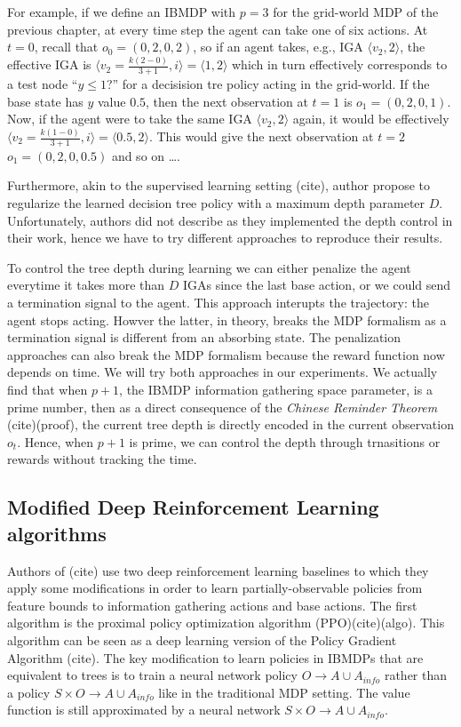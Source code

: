 For example, if we define an IBMDP with $p=3$ for the grid-world MDP of the previous chapter, at every time step the agent can take one of six actions. 
At $t=0$, recall that $o_0=(0, 2, 0, 2)$, so if an agent takes, e.g., IGA $\langle v_2, 2 \rangle$, the effective IGA is $\langle v_2=\frac{k(2-0)}{3+1}, i \rangle = \langle 1, 2 \rangle$ which in turn effectively corresponds to a test node ``$y \leq 1$?'' for a decisision tre policy acting in the grid-world.
If the base state has $y$ value $0.5$, then the next observation at $t=1$ is $o_1=(0, 2, 0, 1)$. Now, if the agent were to take the same IGA $\langle v_2, 2 \rangle$ again, it would be effectively $\langle v_2=\frac{k(1-0)}{3+1}, i \rangle = \langle 0.5, 2 \rangle$. 
This would give the next observation at $t=2$ $o_1=(0, 2, 0, 0.5)$ and so on \dots. 

Furthermore, akin to the supervised learning setting (cite), author propose to regularize the learned decision tree policy with a maximum depth parameter $D$.
Unfortunately, authors did not describe as they implemented the depth control in their work, hence we have to try different approaches to reproduce their results.

To control the tree depth during learning we can either penalize the agent everytime it takes more than $D$ IGAs since the last base action, or we could send a termination signal to the agent. This approach interupts the trajectory: the agent stops acting. Howver the latter, in theory, breaks the MDP formalism as a termination signal is different from an absorbing state.
The penalization approaches can also break the MDP formalism because the reward function now depends on time. We will try both approaches in our experiments.
We actually find that when $p+1$, the IBMDP information gathering space parameter, is a prime number, then as a direct consequence of the \textit{Chinese Reminder Theorem} (cite)(proof), the current tree depth is directly encoded in the current observation $o_t$. 
Hence, when $p+1$ is prime, we can control the depth through trnasitions or rewards without tracking the time.


\subsection{Modified Deep Reinforcement Learning algorithms}
Authors of (cite) use two deep reinforcement learning baselines to which they apply some modifications in order to learn partially-observable policies from feature bounds to information gathering actions and base actions.
The first algorithm is the proximal policy optimization algorithm (PPO)(cite)(algo). This algorithm can be seen as a deep learning version of the Policy Gradient Algorithm (cite). 
The key modification to learn policies in IBMDPs that are equivalent to trees is to train a neural network policy $O\rightarrow A\cup A_{info}$ rather than a policy $S\times O\rightarrow A\cup A_{info}$ like in the traditional MDP setting.
The value function is still approximated by a neural network $S \times O \rightarrow A\cup A_{info}$.

